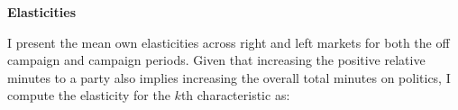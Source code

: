 \documentclass[12pt]{article}
\begin{document}

	
	
	\textbf{Elasticities}
	
	I present the mean own elasticities across right and left markets for both the off campaign and campaign periods.  Given that increasing the positive relative minutes to a party also implies increasing the overall total minutes on politics, I compute the elasticity for the $k$th characteristic as: 
	
\end{document}
